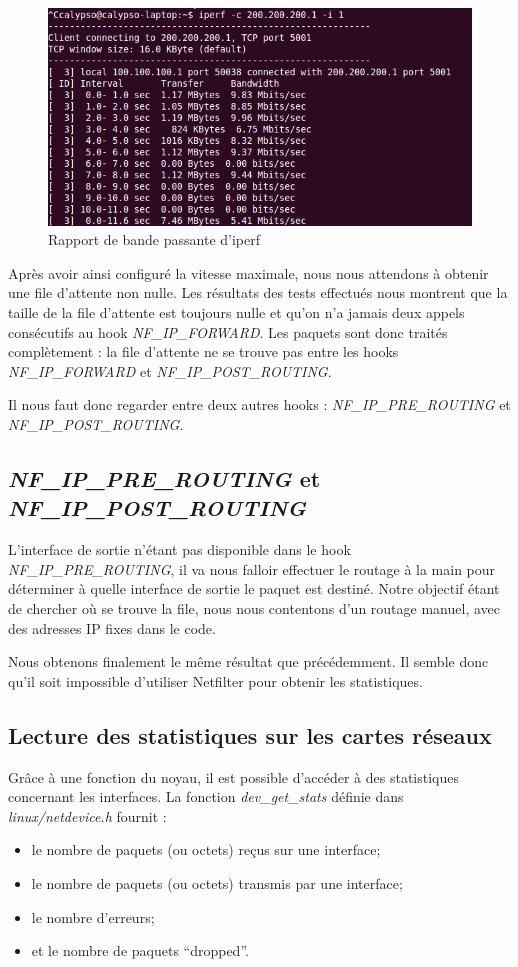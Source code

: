\documentclass[a4paper]{article}
\begin{document}
\begin{figure}[!ht]
	\centering
	\includegraphics[scale=.5]{Capture-4.png}
	\caption{\label{iperfe} Rapport de bande passante d'iperf}
\end{figure}

Après avoir ainsi configuré la vitesse maximale,
nous nous attendons à obtenir une file d’attente non nulle.
Les résultats des tests effectués nous montrent que la taille
de la file d’attente est toujours nulle et qu'on n'a jamais
deux appels consécutifs au hook \textit{NF\_IP\_FORWARD}. 
Les paquets sont donc traités complètement : la file d'attente
ne se trouve pas entre les hooks
\textit{NF\_IP\_FORWARD} et \textit{NF\_IP\_POST\_ROUTING}.

Il nous faut donc regarder entre deux autres 
hooks : \textit{NF\_IP\_PRE\_ROUTING} et \textit{NF\_IP\_POST\_ROUTING}.

\subsection{\textit{NF\_IP\_PRE\_ROUTING} et \textit{NF\_IP\_POST\_ROUTING}}
L'interface de sortie n'étant pas disponible dans le hook \textit{NF\_IP\_PRE\_ROUTING},
il va nous falloir effectuer le routage à la main pour déterminer à quelle interface de sortie le paquet est destiné. Notre
objectif étant de chercher où se trouve la file, nous nous
contentons d'un routage manuel, avec des adresses IP fixes dans le code.

Nous obtenons finalement le même résultat que précédemment. 
Il semble donc qu'il soit impossible d'utiliser Netfilter pour
obtenir les statistiques. 

\subsection{Lecture des statistiques sur les cartes réseaux}
Grâce à une fonction du noyau, il est possible d’accéder à des
statistiques concernant les interfaces. La fonction \textit{dev\_get\_stats}
définie dans \textit{linux/netdevice.h} fournit :
\begin{itemize}
	\item le nombre de paquets (ou octets) reçus sur une interface;
	\item le nombre de paquets (ou octets) transmis par une interface;
	\item le nombre d’erreurs;
	\item et le nombre de paquets “dropped”.
\end{itemize}
\end{document}
